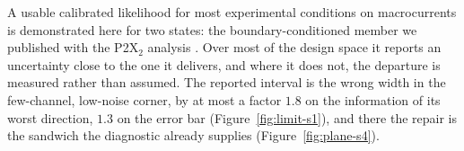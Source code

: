 %
%
%

A usable calibrated likelihood for most experimental conditions on macrocurrents is demonstrated here for two states: the boundary-conditioned member we published with the P2X$_2$ analysis \citep{moffatt2025bayesian}. Over most of the design space it reports an uncertainty close to the one it delivers, and where it does not, the departure is measured rather than assumed. The reported interval is the wrong width in the few-channel, low-noise corner, by at most a factor $1.8$ on the information of its worst direction, $1.3$ on the error bar (Figure~\ref{fig:limit-s1}), and there the repair is the sandwich the diagnostic already supplies (Figure~\ref{fig:plane-s4}).

